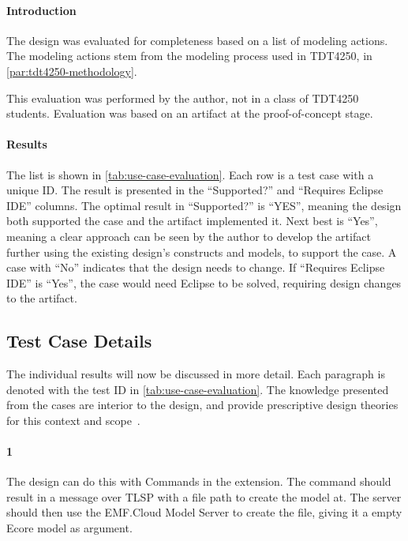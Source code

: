 
\paragraph{Introduction}
The design was evaluated for completeness based on a list of modeling actions.
The modeling actions stem from the modeling process used in \gls{TDT4250}, in \cref{par:tdt4250-methodology}.

This evaluation was performed by the author, not in a class of \gls{TDT4250} students.
Evaluation was based on an artifact at the proof-of-concept stage.

\paragraph{Results}
The list is shown in \cref{tab:use-case-evaluation}.
Each row is a test case with a unique ID.
The result is presented in the ``Supported?'' and ``Requires Eclipse IDE'' columns.
The optimal result in ``Supported?'' is ``YES'', meaning the design both supported the case and the artifact implemented it.
Next best is ``Yes'', meaning a clear approach can be seen by the author to develop the artifact further using the existing design's constructs and models, to support the case.
A case with ``No'' indicates that the design needs to change.
If ``Requires Eclipse IDE'' is ``Yes'', the case would need \gls{Eclipse} to be solved, requiring design changes to the artifact.



\subsection{Test Case Details}
The individual results will now be discussed in more detail.
Each paragraph is denoted with the test ID in \cref{tab:use-case-evaluation}.
The knowledge presented from the cases are interior to the design, and provide prescriptive design theories for this context and scope~\cite{sonnenbergEvaluationsScienceArtificial2012}.

\paragraph{1} The design can do this with Commands in the extension.
The command should result in a message over \acrshort{TLSP} with a file path to create the model at.
The server should then use the EMF.Cloud Model Server to create the file, giving it a empty \gls{Ecore} model as argument.

